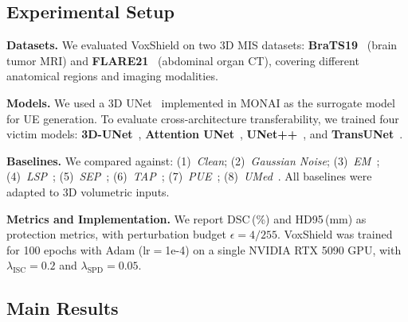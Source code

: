 \documentclass[runningheads]{llncs}
\begin{document}
\subsection{Experimental Setup}

\textbf{Datasets.}
We evaluated VoxShield on two 3D MIS datasets:
\textbf{BraTS19}~\cite{menze2014multimodal} (brain tumor MRI) and
\textbf{FLARE21}~\cite{ma2021abdomenct} (abdominal organ CT), covering different anatomical regions and imaging modalities.


\textbf{Models.}
We used a 3D UNet~\cite{cciccek20163d} implemented in MONAI as the surrogate model
for UE generation. To evaluate cross-architecture transferability, we trained four
victim models: \textbf{3D-UNet}~\cite{cciccek20163d}, \textbf{Attention UNet}~\cite{oktay2018attention},
\textbf{UNet++}~\cite{zhou2018unetpp}, and \textbf{TransUNet}~\cite{chen2021transunet}.


\textbf{Baselines.}
We compared against: (1)~\textit{Clean}; (2)~\textit{Gaussian Noise};
(3)~\textit{EM}~\cite{huang2021unlearnable}; 
(4)~\textit{LSP}~\cite{yu2022availability}; (5)~\textit{SEP}~\cite{liu2023stable};
(6)~\textit{TAP}~\cite{fowl2021adversarial};
(7)~\textit{PUE}~\cite{wang2025provably}; 
(8)~\textit{UMed}~\cite{lin2024safeguarding}. All baselines were
adapted to 3D volumetric inputs.

\textbf{Metrics and Implementation.}
We report DSC\,(\%) and HD95\,(mm) as protection metrics, with perturbation budget $\epsilon=4/255$. VoxShield was trained for 100 epochs with Adam (lr$=$1e-4) on a single NVIDIA RTX 5090 GPU, with $\lambda_{\text{ISC}}=0.2$ and $\lambda_{\text{SPD}}=0.05$.

\subsection{Main Results}
\end{document}
